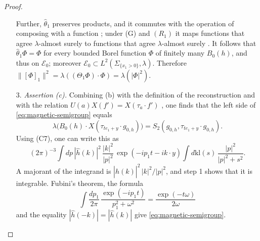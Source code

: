\documentclass[11pt]{amsart}
\theoremstyle{definition}
\begin{document}
\begin{proof}
\begin{enumerate}
Further, $\hat\theta_1$ preserves products, and it commutes with the operation of composing with a function \cite[Section~8.1.2]{QEDI}; under (G) and $(R_1)$ it maps functions that agree $\lambda$-almost surely to functions that agree $\lambda$-almost surely \cite[Section~14.1, after Lemma~14.3]{QEDII}.
It follows that $\hat\theta_1\Phi=\Phi$ for every bounded Borel function $\Phi$ of finitely many $B_0(h)$, and thus on $\mathcal E_0$; moreover $\mathcal E_0\subset L^2(\Sigma_{\{x_1>0\}},\lambda)$.
Therefore $\|[\Phi]_1\|^2=\allowbreak \lambda((\Theta_1\Phi)\cdot\Phi)=\allowbreak \lambda(|\Phi|^2)$.
\item[3.] \emph{Assertion (c).}
Combining (b) with the definition of the reconstruction and with the relation $U(a)X(f')=X(\tau_a\cdot f')$ \cite[Lemma~14.3\,(a)]{QEDII}, one finds that the left side of \eqref{eq:magnetic-semigroup} equals
\begin{equation*}
\lambda\bigl(B_0(h)\cdot X(\tau_{te_1+y}\cdot g_{0,h})\bigr)=S_2(g_{0,h},\tau_{te_1+y}\cdot g_{0,h}).
\end{equation*}
Using (C7), one can write this as
\begin{equation*}
(2\pi)^{-3}\int dp\,|\hat h(k)|^2\,\frac{|k|^2}{|p|^2}\,\exp(-ip_1t-ik\cdot y)\int d\mathrm{kl}(s)\,\frac{|p|^2}{|p|^2+s^2}.
\end{equation*}
A majorant of the integrand is $|\hat h(k)|^2\,|k|^2/|p|^2$, and step 1 shows that it is integrable.
Fubini's theorem, the formula
\begin{equation*}
\int\frac{dp_1}{2\pi}\,\frac{\exp(-ip_1t)}{p_1^2+\omega^2}=\frac{\exp(-t\omega)}{2\omega}
\end{equation*}
and the equality $|\hat h(-k)|=|\hat h(k)|$ give \eqref{eq:magnetic-semigroup}.


\end{enumerate}
\end{proof}
\end{document}
